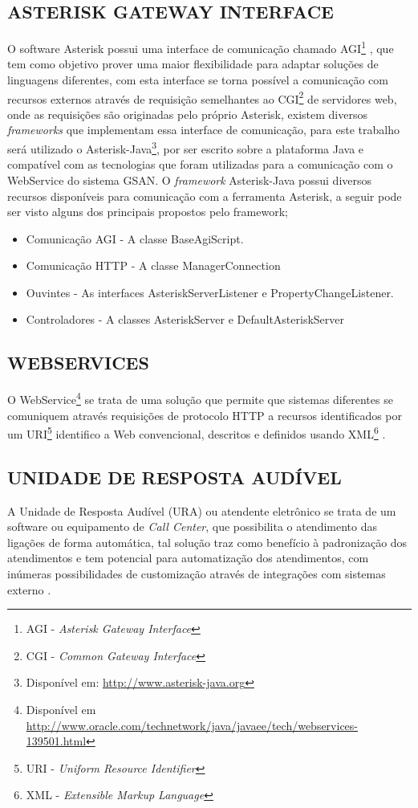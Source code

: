 \subsection{\textbf{\uppercase{Asterisk Gateway Interface}}}
O software Asterisk possui uma interface de comunicação chamado AGI\footnote{AGI - \textit{Asterisk Gateway Interface}} \cite{asteriskAgi}, que tem como objetivo prover uma maior flexibilidade para adaptar soluções de linguagens diferentes, com esta interface se torna possível a comunicação com recursos externos através de requisição semelhantes ao CGI\footnote{CGI - \textit{Common Gateway Interface}} de servidores web, onde as requisições são originadas pelo próprio Asterisk, existem diversos \textit{frameworks} que implementam essa interface de comunicação, para este trabalho será utilizado o Asterisk-Java\footnote{Disponível em: \url{http://www.asterisk-java.org}}\label{key:asteriskjava}, por ser escrito sobre a plataforma Java e compatível com as tecnologias que foram utilizadas para a comunicação com o WebService do sistema GSAN.
O \textit{framework} Asterisk-Java possui diversos recursos disponíveis para comunicação com a ferramenta Asterisk, a seguir pode ser visto alguns dos principais propostos pelo framework;

\begin{itemize}
	\item Comunicação AGI - A classe BaseAgiScript.
	\item Comunicação HTTP - A classe ManagerConnection
	\item Ouvintes - As interfaces AsteriskServerListener e PropertyChangeListener.
	\item Controladores - A classes AsteriskServer e DefaultAsteriskServer
\end{itemize}


\subsection{\textbf{\uppercase{WebServices}}}
O WebService\footnote{Disponível em \url{http://www.oracle.com/technetwork/java/javaee/tech/webservices-139501.html}} se trata de uma solução que permite que sistemas diferentes se comuniquem através requisições de protocolo HTTP a recursos identificados por um URI\footnote{URI - \textit{Uniform Resource Identifier}}  identifico a Web convencional, descritos e definidos usando XML\footnote{XML - \textit{Extensible Markup Language}} .

\subsection{\textbf{\uppercase{Unidade de Resposta Audível}}}
A Unidade de Resposta Audível\label{key:URA} (URA) ou atendente eletrônico se trata de um software ou equipamento de \textit{Call Center}, que possibilita o atendimento das ligações de forma automática, tal solução traz como benefício à padronização dos atendimentos e tem potencial para automatização dos atendimentos, com inúmeras possibilidades de customização através de integrações com sistemas externo \cite{VIEIRA:2007}.

